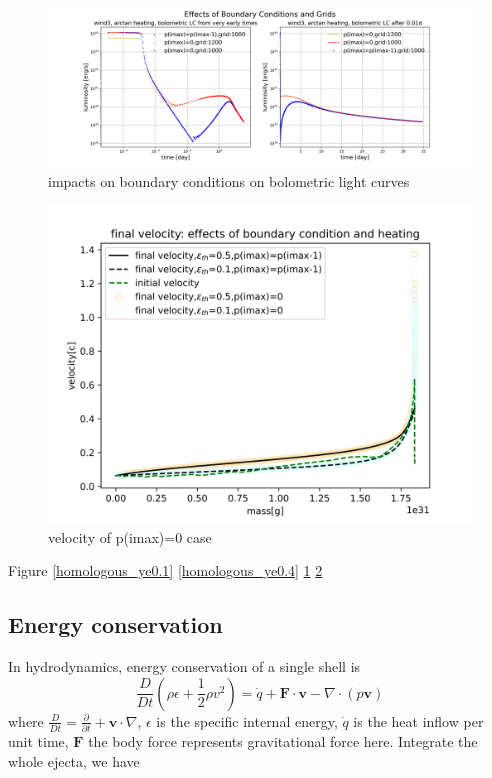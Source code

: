 \documentclass[fleqn,usenatbib]{mnras}
\begin{document}
\begin{figure}
\centering
\includegraphics[scale=0.25]{figures/boundary/Effects_Boundary_Grids_wind3_a.png}
\caption{impacts on boundary conditions on bolometric light curves}
\label{bc_lightcurve}
\end{figure}

\begin{figure}
\centering
\includegraphics[scale=0.5]{figures/boundary/velocity_check.png}
\caption{velocity of p(imax)=0 case}
\label{velocity_check}
\end{figure}

Figure \ref{homologous_ye0.1}  \ref{homologous_ye0.4} \ref{bc_lightcurve} \ref{velocity_check}

\subsection{Energy conservation}
In hydrodynamics, energy conservation of a single shell is 
\begin{equation}
\label{conservation_1}
	\frac{D}{Dt}(\rho \epsilon + \frac{1}{2}\rho v^2) = \dot q + \boldsymbol{F}\cdot \boldsymbol{v}-\nabla \cdot (p\boldsymbol{v})
\end{equation}
where $\frac{D}{Dt} = \frac{\partial}{\partial t} + \boldsymbol{v} \cdot \nabla$, $\epsilon$ is the specific internal energy, $\dot q$ is the heat inflow per unit time, $\boldsymbol{F}$ the body force represents gravitational force here. 
Integrate the whole ejecta, we have
\end{document}
